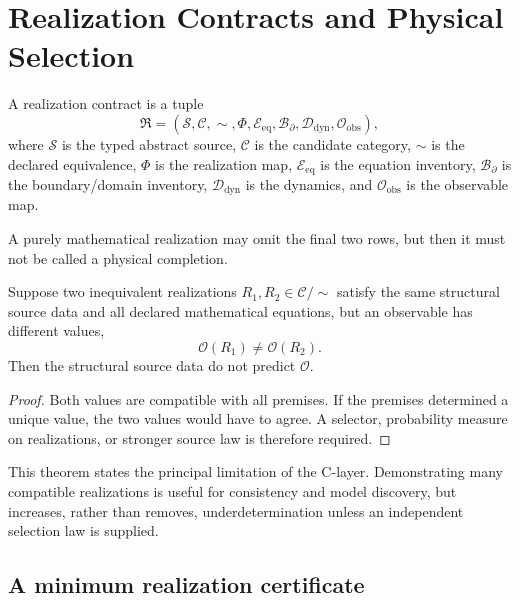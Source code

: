 \documentclass[11pt]{article}
\begin{document}
\section{Realization Contracts and Physical Selection}

\begin{definition}\label{def:contract}
A realization contract is a tuple
\[
 \mathfrak R=
 \left(
 \mathcal S,\mathcal C,\sim,\Phi,
 \mathcal E_{\mathrm{eq}},
 \mathcal B_{\partial},
 \mathcal D_{\mathrm{dyn}},
 \mathcal O_{\mathrm{obs}}
 \right),
\]
where $\mathcal S$ is the typed abstract source, $\mathcal C$ is the candidate
category, $\sim$ is the declared equivalence, $\Phi$ is the realization map,
$\mathcal E_{\mathrm{eq}}$ is the equation inventory,
$\mathcal B_{\partial}$ is the boundary/domain inventory,
$\mathcal D_{\mathrm{dyn}}$ is the dynamics, and
$\mathcal O_{\mathrm{obs}}$ is the observable map.
\end{definition}

A purely mathematical realization may omit the final two rows, but then it
must not be called a physical completion.

\begin{theorem}\label{thm:nonunique}
Suppose two inequivalent realizations $R_1,R_2\in\mathcal C/{\sim}$ satisfy
the same structural source data and all declared mathematical equations, but
an observable has different values,
\[
 \mathcal O(R_1)\ne\mathcal O(R_2).
\]
Then the structural source data do not predict $\mathcal O$.
\end{theorem}

\begin{proof}
Both values are compatible with all premises.  If the premises determined a
unique value, the two values would have to agree.  A selector, probability
measure on realizations, or stronger source law is therefore required.
\end{proof}

This theorem states the principal limitation of the C-layer.  Demonstrating
many compatible realizations is useful for consistency and model discovery,
but increases, rather than removes, underdetermination unless an independent
selection law is supplied.

\subsection{A minimum realization certificate}
\end{document}
